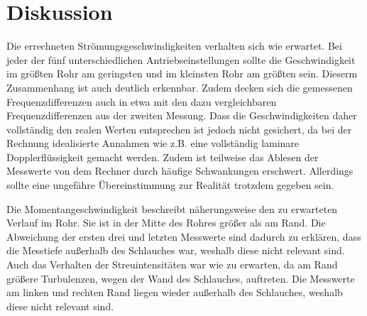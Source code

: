 \section{Diskussion}
\label{sec:Diskussion}
Die errechneten Strömungsgeschwindigkeiten verhalten sich wie erwartet. Bei jeder der fünf unterschiedlichen
Antriebseinstellungen sollte die Geschwindigkeit im größten Rohr am geringsten und im kleinsten Rohr am größten sein.
Dieserm Zusammenhang ist auch deutlich erkennbar. Zudem decken sich die gemessenen Frequenzdifferenzen auch in etwa mit den
dazu vergleichbaren Frequenzdifferenzen aus der zweiten Messung. Dass die Geschwindigkeiten daher vollständig den realen Werten entsprechen
ist jedoch nicht gesichert, da bei der Rechnung idealisierte Annahmen wie z.B. eine vollständig laminare Dopplerflüssigkeit gemacht werden.
Zudem ist teilweise das Ablesen der Messwerte von dem Rechner durch häufige Schwankungen erschwert.
Allerdings sollte eine ungefähre Übereinstimmung zur Realität trotzdem gegeben sein.

Die Momentangeschwindigkeit beschreibt näherungsweise den zu erwarteten Verlauf im Rohr. Sie ist in der Mitte des Rohres größer als am Rand. Die Abweichung der ersten drei und letzten
Messwerte sind dadurch zu erklären, dass die Messtiefe außerhalb des Schlauches war, weshalb diese nicht relevant sind.
Auch das Verhalten der Streuintensitäten war wie zu erwarten, da am Rand größere Turbulenzen, wegen der Wand des Schlauches, auftreten. Die Messwerte am linken und rechten Rand liegen
wieder außerhalb des Schlauches, weshalb diese nicht relevant sind.
